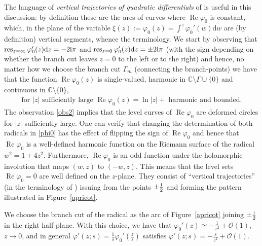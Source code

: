 \documentclass[pdftex]{sigma}
\numberwithin{equation}{section}
\theoremstyle{definition}
\def\le{\left}
\def\ri{\right}
\def \d{{\mathrm d}}
\def\res{\mathop{\mathrm {res}}}
\def\C{{\mathbb C}}
\def \Re{\operatorname{Re} }
\begin{document}
The language of {\it vertical trajectories of quadratic differentials} of \cite{Strebel} is useful in this discussion: by definition these are the arcs of curves where $\Re \varphi_0$ is constant, which, in the plane of the variable $\xi(z):= \varphi_0(z) = \int^z \varphi_0'(w)\d w$ are (by definition) vertical segments, whence the terminology.
We start by observing that $\res_{z=\infty} \varphi'_0(z)\d z=-2{\rm i}\pi$ and $\res_{z=0}\varphi'_0(z)\d z = \pm 2{\rm i}\pi $ (with the sign depending on whether the branch cut leaves $z=0$ to the left or to the right) and hence, no matter how we choose the branch cut $\Gamma_m$ (connecting the branch-points) we have that
the function $\Re \varphi_0(z)$ is single-valued, harmonic in $\C\setminus \Gamma\cup\{0\}$ and continuous in $\C \setminus \{0\}$,
\begin{gather}
\label{obs2}
\text{for $|z|$ sufficiently large $\Re \varphi_0(z) = \ln |z| + $ harmonic and bounded.}
\end{gather}
 The observation \eqref{obs2} implies that the level curves of $\Re \varphi_0$ are deformed circles for $|z|$ sufficiently large.
 One can verify that changing the determination of both radicals in \eqref{phi0} has the effect of flipping the sign of $\Re\varphi_0$ and hence that $\Re \varphi_0$ is a well-defined harmonic function on the Riemann surface of the radical
 $
 w^2= {1 + 4z^2}$.
 Furthermore, $\Re \varphi_0$ is an odd function under the holomorphic involution that maps $(w,z)$ to $(-w,z)$.
 This means that the level sets $\Re \varphi_0=0$ are well defined on the $z$-plane. They consist of ``vertical trajectories'' (in the terminology of \cite{Strebel}) issuing from the points $\pm \frac {\rm i}2$ and forming the pattern illustrated in Figure~\ref{apricot}.

We choose the branch cut of the radical as the arc of Figure~\ref{apricot} joining $\pm \frac {\rm i}2 $ in the right half-plane.
With this choice, we have that
$\varphi_0'(z) \simeq - \frac 1 {z^2} + \mathcal O(1)$, $ z\to 0$,
and in general $\varphi'(z;s) = \frac 1 s \varphi_0'\le(\frac z s\ri)$ satisfies
$\varphi'(z;s) = -\frac s {z^2} + \mathcal O(1)$.
\end{document}
